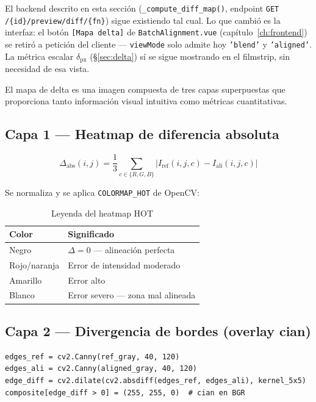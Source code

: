 \begin{warnbox}
El backend descrito en esta sección (\texttt{\_compute\_diff\_map()}, endpoint
\texttt{GET /\{id\}/preview/diff/\{fn\}}) sigue existiendo tal cual. Lo que cambió es la
interfaz: el botón \texttt{[Mapa delta]} de \texttt{BatchAlignment.vue}
(capítulo~\ref{ch:frontend}) se retiró a petición del cliente — \texttt{viewMode} solo admite
hoy \texttt{'blend'} y \texttt{'aligned'}. La métrica escalar $\delta_\text{px}$
(\S\ref{sec:delta}) sí se sigue mostrando en el filmstrip, sin necesidad de esa vista.
\end{warnbox}

El mapa de delta es una imagen compuesta de tres capas superpuestas que proporciona tanto
información visual intuitiva como métricas cuantitativas.

\subsection{Capa 1 — Heatmap de diferencia absoluta}

\begin{equation}
  \Delta_\text{abs}(i,j) = \frac{1}{3}\sum_{c \in \{R,G,B\}} |I_\text{ref}(i,j,c) - I_\text{ali}(i,j,c)|
\end{equation}

Se normaliza y se aplica \texttt{COLORMAP\_HOT} de OpenCV:

\begin{table}[H]
\centering
\caption{Leyenda del heatmap HOT}
\begin{tabular}{C{2cm} L{8cm}}
\toprule
\textbf{Color} & \textbf{Significado} \\
\midrule
Negro & $\Delta = 0$ — alineación perfecta \\
Rojo/naranja & Error de intensidad moderado \\
Amarillo & Error alto \\
Blanco & Error severo — zona mal alineada \\
\bottomrule
\end{tabular}
\end{table}

\subsection{Capa 2 — Divergencia de bordes (overlay cian)}

\begin{codebox}[]
\begin{verbatim}
edges_ref = cv2.Canny(ref_gray, 40, 120)
edges_ali = cv2.Canny(aligned_gray, 40, 120)
edge_diff = cv2.dilate(cv2.absdiff(edges_ref, edges_ali), kernel_5x5)
composite[edge_diff > 0] = (255, 255, 0)  # cian en BGR
\end{verbatim}
\end{codebox}

